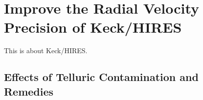 \chapter{Improve the Radial Velocity Precision of Keck/HIRES}\label{chap:keck}

This is about Keck/HIRES.


\section{Effects of Telluric Contamination and Remedies}\label{keck:sec:telluric}
